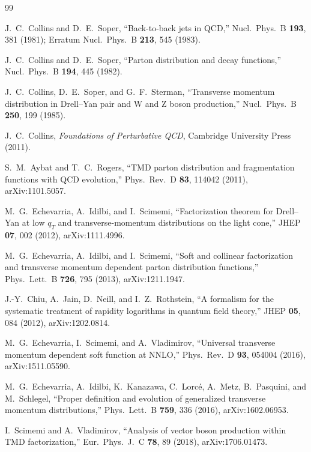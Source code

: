 \documentclass[11pt]{article}
\begin{document}
\small
\begin{thebibliography}{99}

J.~C.~Collins and D.~E.~Soper,
``Back-to-back jets in QCD,''
Nucl.\ Phys.\ B \textbf{193}, 381 (1981);
Erratum Nucl.\ Phys.\ B \textbf{213}, 545 (1983).

J.~C.~Collins and D.~E.~Soper,
``Parton distribution and decay functions,''
Nucl.\ Phys.\ B \textbf{194}, 445 (1982).

J.~C.~Collins, D.~E.~Soper, and G.~F.~Sterman,
``Transverse momentum distribution in Drell--Yan pair and W and Z boson
production,''
Nucl.\ Phys.\ B \textbf{250}, 199 (1985).

J.~C.~Collins,
\emph{Foundations of Perturbative QCD},
Cambridge University Press (2011).

S.~M.~Aybat and T.~C.~Rogers,
``TMD parton distribution and fragmentation functions with QCD evolution,''
Phys.\ Rev.\ D \textbf{83}, 114042 (2011), arXiv:1101.5057.

M.~G.~Echevarria, A.~Idilbi, and I.~Scimemi,
``Factorization theorem for Drell--Yan at low \(q_T\) and transverse-momentum
distributions on the light cone,''
JHEP \textbf{07}, 002 (2012), arXiv:1111.4996.

M.~G.~Echevarria, A.~Idilbi, and I.~Scimemi,
``Soft and collinear factorization and transverse momentum dependent parton
distribution functions,''
Phys.\ Lett.\ B \textbf{726}, 795 (2013), arXiv:1211.1947.

J.-Y.~Chiu, A.~Jain, D.~Neill, and I.~Z.~Rothstein,
``A formalism for the systematic treatment of rapidity logarithms in quantum
field theory,''
JHEP \textbf{05}, 084 (2012), arXiv:1202.0814.

M.~G.~Echevarria, I.~Scimemi, and A.~Vladimirov,
``Universal transverse momentum dependent soft function at NNLO,''
Phys.\ Rev.\ D \textbf{93}, 054004 (2016), arXiv:1511.05590.

M.~G.~Echevarria, A.~Idilbi, K.~Kanazawa, C.~Lorc\'e, A.~Metz,
B.~Pasquini, and M.~Schlegel,
``Proper definition and evolution of generalized transverse momentum
distributions,''
Phys.\ Lett.\ B \textbf{759}, 336 (2016), arXiv:1602.06953.

I.~Scimemi and A.~Vladimirov,
``Analysis of vector boson production within TMD factorization,''
Eur.\ Phys.\ J.\ C \textbf{78}, 89 (2018), arXiv:1706.01473.


\end{thebibliography}
\end{document}
